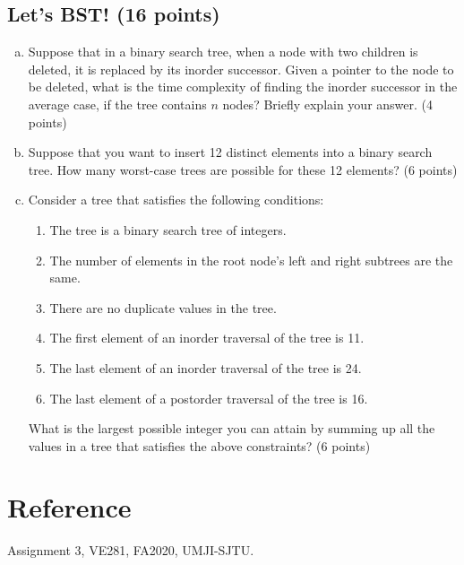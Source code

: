 \documentclass[11pt]{exam}
\begin{document}
\subsection{Let's BST! (16 points)}
\begin{enumerate}[a)]
\item Suppose that in a binary search tree, when a node with two children is deleted, it is replaced by its inorder successor. Given a pointer to the node to be deleted, what is the time complexity of finding the inorder successor in the average case, if the tree contains $n$ nodes? Briefly explain your answer. (4 points)
\begin{solution}
\end{solution}

\item
Suppose that you want to insert 12 distinct elements into a binary search tree. How many worst-case trees are possible for these 12 elements? (6 points)
\begin{solution}
\end{solution}

\item
Consider a tree that satisfies the following conditions:
\begin{enumerate}[1.]
\item The tree is a binary search tree of integers.
\item The number of elements in the root node's left and right subtrees are the same.
\item There are no duplicate values in the tree.
\item The first element of an inorder traversal of the tree is 11.
\item The last element of an inorder traversal of the tree is 24.
\item The last element of a postorder traversal of the tree is 16.
\end{enumerate}

What is the largest possible integer you can attain by summing up all the values in a tree that satisfies the above constraints? (6 points)

\begin{solution}
\end{solution}


\end{enumerate}

\section*{Reference}
Assignment 3, VE281, FA2020, UMJI-SJTU.
\end{document}
